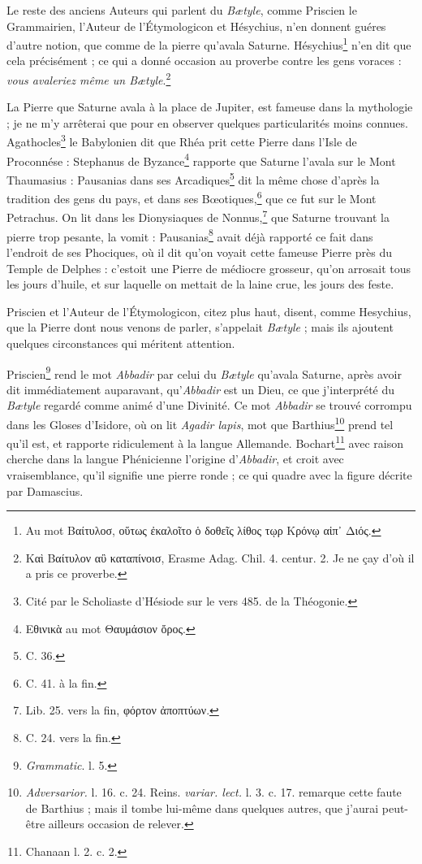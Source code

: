 \documentclass[a4paper, 11pt, oneside, polutonikogreek, french]{article}
\begin{document}
Le reste des anciens Auteurs qui parlent du \emph{Bætyle}, comme Priscien le Grammairien, l'Auteur de l'Étymologicon et Hésychius, n'en donnent guéres d'autre notion, que comme de la pierre qu'avala Saturne. Hésychius\footnote{Au mot Βαίτυλοσ, οὕτως ἐκαλοῖτο ὁ δοθεῖς λίθος τῳρ Κρόνῳ αἰπ᾽ Διός.} n'en dit que cela précisément ; ce qui a donné occasion au proverbe contre les gens voraces : \emph{vous avaleriez même un Bætyle}.\footnote{Καὶ Βαίτυλον αὒ καταπίνοισ, Erasme Adag. Chil. 4. centur. 2. Je ne çay d'où il a pris ce proverbe.}

La Pierre que Saturne avala à la place de Jupiter, est fameuse dans la mythologie ; je ne m'y arrêterai que pour en observer quelques particularités moins connues. Agathocles\footnote{Cité par le Scholiaste d'Hésiode sur le vers 485. de la Théogonie.} le Babylonien dit que Rhéa prit cette Pierre dans l'Isle de Proconnése : Stephanus de Byzance\footnote{Εθινικὰ au mot Θαυμάσιον ὄρος.} rapporte que Saturne l'avala sur le Mont Thaumasius : Pausanias dans ses Arcadiques\footnote{C. 36.} dit la même chose d'après la tradition des gens du pays, et dans ses Bœotiques,\footnote{C. 41. à la fin.} que ce fut sur le Mont Petrachus. On lit dans les Dionysiaques de Nonnus,\footnote{Lib. 25. vers la fin, φόρτον ἀποπτύων.} que Saturne trouvant la pierre trop pesante, la vomit : Pausanias\footnote{C. 24. vers la fin.} avait déjà rapporté ce fait dans l'endroit de ses Phociques, où il dit qu'on voyait cette fameuse Pierre près du Temple de Delphes : c'estoit une Pierre de médiocre grosseur, qu'on arrosait tous les jours d'huile, et sur laquelle on mettait de la laine crue, les jours des feste.

Priscien et l'Auteur de l'Étymologicon, citez plus haut, disent, comme Hesychius, que la Pierre dont nous venons de parler, s'appelait \emph{Bætyle} ; mais ils ajoutent quelques circonstances qui méritent attention.

Priscien\footnote{\emph{Grammatic}. l. 5.} rend le mot \emph{Abbadir} par celui du \emph{Bætyle} qu'avala Saturne, après avoir dit immédiatement auparavant, qu'\emph{Abbadir} est un Dieu, ce que j'interprété du \emph{Bætyle} regardé comme animé d'une Divinité. Ce mot \emph{Abbadir} se trouvé corrompu dans les Gloses d'Isidore, où on lit \emph{Agadir lapis}, mot que Barthius\footnote{\emph{Adversarior.} l. 16. c. 24. Reins. \emph{variar. lect.} l. 3. c. 17. remarque cette faute de Barthius ; mais il tombe lui-même dans quelques autres, que j'aurai peut-être ailleurs occasion de relever.} prend tel qu'il est, et rapporte ridiculement à la langue Allemande. Bochart\footnote{Chanaan l. 2. c. 2.} avec raison cherche dans la langue Phénicienne l'origine d'\emph{Abbadir}, et croit avec vraisemblance, qu'il signifie une pierre ronde ; ce qui quadre avec la figure décrite par Damascius.
\end{document}
